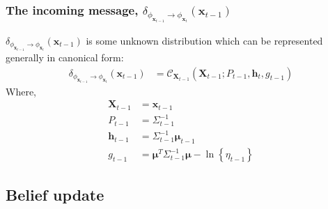 \subsubsection{The incoming message, $\delta_{\phi_{\pmb{x}_{t-1}} \rightarrow \phi_{\pmb{x}_{t}}} (\pmb{x}_{t-1})$}
\label{subsubsection:rec_bel}

$\delta_{\phi_{\pmb{x}_{t-1}} \rightarrow \phi_{\pmb{x}_{t}}} (\pmb{x}_{t-1})$ is some unknown distribution which can be represented generally in canonical form:
\begin{align}
\delta_{\phi_{\pmb{x}_{t-1}} \rightarrow \phi_{\pmb{x}_{t}}} (\pmb{x}_{t-1}) &= \mathcal{C}_{\pmb{X}_{t-1}} \left( \pmb{X}_{t-1}; P_{t-1}, \pmb{h}_{t}, g_{t-1} \right) 
\end{align}
Where, 
\begin{align}
\pmb{X}_{t-1} &= \pmb{x}_{t-1} \\
P_{t-1} &= \Sigma^{-1}_{t-1} \\
\mathbf{h}_{t-1} &= \Sigma_{t-1}^{-1} \pmb{\mu}_{t-1} \\
g_{t-1} &= \pmb{\mu}^{T} \Sigma_{t-1}^{-1} \pmb{\mu} - \ln{ \left\{ \eta_{t-1} \right\} }
\end{align}
 
\subsection{Belief update}
\label{section:belief_update}

